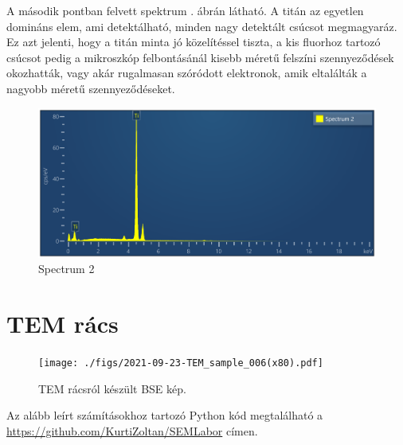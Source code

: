 \documentclass[pdftex,12pt,a4paper]{article}
\begin{document}
			A második pontban felvett spektrum . ábrán látható. A titán az egyetlen domináns elem, ami detektálható, minden nagy detektált csúcsot megmagyaráz. Ez azt jelenti, hogy a titán minta jó közelítéssel tiszta, a kis fluorhoz tartozó csúcsot pedig a mikroszkóp felbontásánál kisebb méretű felszíni szennyeződések okozhatták, vagy akár rugalmasan szóródott elektronok, amik eltalálták a nagyobb méretű szennyeződéseket.
			\begin{figure}[H]
				\centering
				\includegraphics[scale=0.7]{./figs/spectrum2.png}
				\caption{Spectrum 2}
				\label{spectrum2}
			\end{figure}
	\section{TEM rács}
		\begin{figure}[H]
			\centering
			\texttt{[image: ./figs/2021-09-23-TEM\_sample\_006(x80).pdf]}
			\caption{TEM rácsról készült BSE kép.}
			\label{temgrid}
		\end{figure}
		Az alább leírt számításokhoz tartozó Python kód megtalálható a \url{https://github.com/KurtiZoltan/SEMLabor} címen.
		
\end{document}
